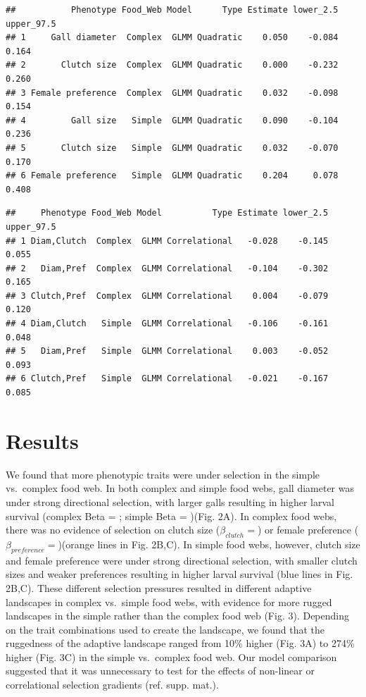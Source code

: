 \documentclass[]{elsarticle} %
\begin{document}
\begin{verbatim}
##           Phenotype Food_Web Model      Type Estimate lower_2.5 upper_97.5
## 1     Gall diameter  Complex  GLMM Quadratic    0.050    -0.084      0.164
## 2       Clutch size  Complex  GLMM Quadratic    0.000    -0.232      0.260
## 3 Female preference  Complex  GLMM Quadratic    0.032    -0.098      0.154
## 4         Gall size   Simple  GLMM Quadratic    0.090    -0.104      0.236
## 5       Clutch size   Simple  GLMM Quadratic    0.032    -0.070      0.170
## 6 Female preference   Simple  GLMM Quadratic    0.204     0.078      0.408
\end{verbatim}

\begin{verbatim}
##     Phenotype Food_Web Model          Type Estimate lower_2.5 upper_97.5
## 1 Diam,Clutch  Complex  GLMM Correlational   -0.028    -0.145      0.055
## 2   Diam,Pref  Complex  GLMM Correlational   -0.104    -0.302      0.165
## 3 Clutch,Pref  Complex  GLMM Correlational    0.004    -0.079      0.120
## 4 Diam,Clutch   Simple  GLMM Correlational   -0.106    -0.161      0.048
## 5   Diam,Pref   Simple  GLMM Correlational    0.003    -0.052      0.093
## 6 Clutch,Pref   Simple  GLMM Correlational   -0.021    -0.167      0.085
\end{verbatim}

\section{Results}\label{results}

We found that more phenotypic traits were under selection in the simple
vs.~complex food web. In both complex and simple food webs, gall
diameter was under strong directional selection, with larger galls
resulting in higher larval survival (complex Beta = ; simple Beta =
)(Fig. 2A). In complex food webs, there was no evidence of selection on
clutch size (\(\beta_{clutch}=\)) or female preference
(\(\beta_{preference}=\))(orange lines in Fig. 2B,C). In simple food
webs, however, clutch size and female preference were under strong
directional selection, with smaller clutch sizes and weaker preferences
resulting in higher larval survival (blue lines in Fig. 2B,C). These
different selection pressures resulted in different adaptive landscapes
in complex vs.~simple food webs, with evidence for more rugged
landscapes in the simple rather than the complex food web (Fig. 3).
Depending on the trait combinations used to create the landscape, we
found that the ruggedness of the adaptive landscape ranged from 10\%
higher (Fig. 3A) to 274\% higher (Fig. 3C) in the simple vs.~complex
food web. Our model comparison suggested that it was unnecessary to test
for the effects of non-linear or correlational selection gradients (ref.
supp. mat.).
\end{document}
